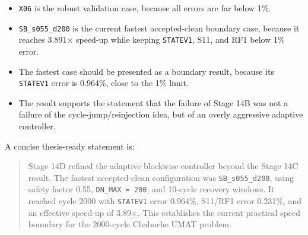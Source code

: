 \begin{itemize}
  \item \texttt{X06} is the robust validation case, because all errors are far below 1\%.
  \item \texttt{SB\_s055\_d200} is the current fastest accepted-clean boundary case, because it reaches 3.891$\times$ speed-up while keeping \texttt{STATEV1}, S11, and RF1 below 1\% error.
  \item The fastest case should be presented as a boundary result, because its \texttt{STATEV1} error is 0.964\%, close to the 1\% limit.
  \item The result supports the statement that the failure of Stage 14B was not a failure of the cycle-jump/reinjection idea, but of an overly aggressive adaptive controller.
\end{itemize}

A concise thesis-ready statement is:

\begin{quote}
Stage 14D refined the adaptive blockwise controller beyond the Stage 14C result. The fastest accepted-clean configuration was \texttt{SB\_s055\_d200}, using safety factor 0.55, \texttt{DN\_MAX = 200}, and 10-cycle recovery windows. It reached cycle 2000 with \texttt{STATEV1} error 0.964\%, S11/RF1 error 0.231\%, and an effective speed-up of 3.89$\times$. This establishes the current practical speed boundary for the 2000-cycle Chaboche UMAT problem.
\end{quote}
